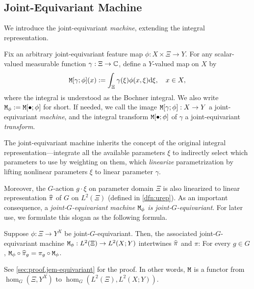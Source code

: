 \subsection{Joint-Equivariant Machine}
We introduce the joint-equivariant \emph{machine}, extending the integral representation.
\begin{definition}%
Fix an arbitrary joint-equivariant feature map $\phi:X \times \Xi \to Y$. For any scalar-valued measurable function $\gamma:\Xi\to\mathbb{C}$, define a $Y$-valued map on $X$ by
\begin{align*}
    \mathtt{M}[\gamma;\phi](x) :=
    \int_\Xi \gamma(\xi) \phi(x,\xi) \mathrm{d} \xi, \quad x \in X,
\end{align*}
where the integral is understood as the Bochner integral. 
We also write $\mathtt{M}_\phi := \mathtt{M}[\bullet;\phi]$ for short.
If needed, we call the image $\mathtt{M}[\gamma;\phi] : X \to Y$ a joint-equivariant \emph{machine},
and the integral transform $\mathtt{M}[\bullet;\phi]$ of $\gamma$ a joint-equivariant \emph{transform}.
\end{definition}
The joint-equivariant machine inherits the concept of 
the original integral representation---integrate all the available parameters $\xi$ to indirectly select which parameters to use by weighting on them, which \emph{linearize} parametrization by lifting nonlinear parameters $\xi$ to linear parameter $\gamma$.

Moreover, the $G$-action $g \cdot \xi$ on parameter domain $\Xi$ is also linearized to linear representation $\widehat{\pi}$ of $G$ on $L^2(\Xi)$ (defined in \cref{dfn:urep}). 
As an important consequence, a \emph{joint-$G$-equivariant machine $\mathtt{M}_\phi$ is joint-$G$-equivariant}. For later use, we formulate this slogan as the following formula.
\begin{lemma} \label{lem:jem-equivariant}
Suppose $\phi : \Xi \to Y^X$ be joint-$G$-equivariant.
Then, the associated joint-$G$-equivariant machine $\mathtt{M}_\phi : L^2(\Xi) \to L^2(X;Y)$ intertwines $\widehat{\pi}$ and $\pi$: For every $g \in G$, $\mathtt{M}_\phi \circ \widehat{\pi}_g = \pi_g \circ \mathtt{M}_\phi$.
\end{lemma}
See \cref{sec:proof.jem-equivariant} for the proof. In other words, $\mathtt{M}$ is a functor from $\hom_G(\Xi,Y^X)$ to $\hom_G( L^2(\Xi), L^2(X;Y) )$.

